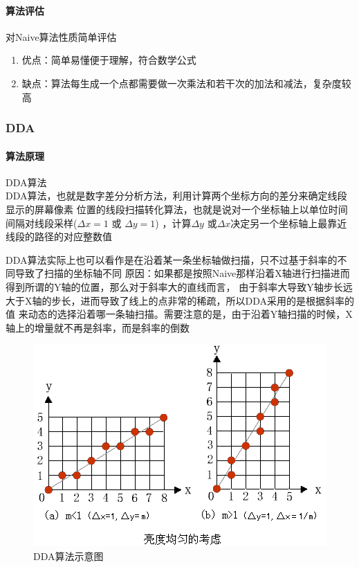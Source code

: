 \documentclass[a4paper,UTF8]{article}
\theoremstyle{definition}
\begin{document}
\paragraph{算法评估} 
对Naive算法性质简单评估
\begin{enumerate}
    \item 优点：简单易懂便于理解，符合数学公式
    \item 缺点：算法每生成一个点都需要做一次乘法和若干次的加法和减法，复杂度较高
\end{enumerate}

\subsubsection{DDA}
\paragraph{算法原理}
DDA算法\\
DDA算法，也就是数字差分分析方法，利用计算两个坐标方向的差分来确定线段显示的屏幕像素
位置的线段扫描转化算法，也就是说对一个坐标轴上以单位时间间隔对线段采样($\Delta x=1$ 或 $\Delta y=1$)
，计算$\Delta y$ 或$\Delta x$决定另一个坐标轴上最靠近线段的路径的对应整数值\cite{ref1}

DDA算法实际上也可以看作是在沿着某一条坐标轴做扫描，只不过基于斜率的不同导致了扫描的坐标轴不同
原因：如果都是按照Naive那样沿着X轴进行扫描进而得到所谓的Y轴的位置，那么对于斜率大的直线而言，
由于斜率大导致Y轴步长远大于X轴的步长，进而导致了线上的点非常的稀疏，所以DDA采用的是根据斜率的值
来动态的选择沿着哪一条轴扫描。需要注意的是，由于沿着Y轴扫描的时候，X轴上的增量就不再是斜率，而是斜率的倒数

\begin{figure}[h]
	\centering
	\includegraphics[scale=1]{figure/DDA.png}
	\caption{DDA算法示意图}
	\label{fig:DDA}
\end{figure}
\end{document}
